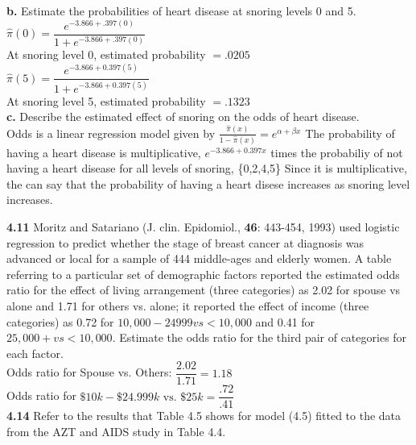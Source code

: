 \documentclass[paper=letter, fontsize=11pt]{scrartcl} %
\begin{document}
\textbf{b.} Estimate the probabilities of heart disease at snoring levels 0 and 5. \\
$\hat{\pi}(0) = \dfrac{e^{-3.866+.397(0)}}{1+e^{-3.866+.397(0)}}$ \\
At snoring level 0, estimated probability $= .0205$ \\
$\hat{\pi}(5) = \dfrac{e^{-3.866+0.397(5)}}{1+e^{-3.866+0.397(5)}}$ \\
At snoring level 5, estimated probability $= .1323$ 
\\

\textbf{c.} Describe the estimated effect of snoring on the odds of heart disease. \\
Odds is a linear regression model given by $\frac{\hat{\pi}(x)}{1-\hat{\pi}(x)}
= e^{\alpha + \beta x}$
The probability of having a heart disease is multiplicative, $e^{-3.866+0.397x}$ 
times the probabiliy of not having a heart disease for all levels of snoring, \{0,2,4,5\}
Since it is multiplicative, the can say that the probability of having a heart disese 
increases as snoring level increases.

\textbf{4.11} Moritz and Satariano (J. clin. Epidomiol., \textbf{46}: 443-454, 1993) used
logistic regression to predict whether the stage of breast cancer at diagnosis was 
advanced or local for a sample of 444 middle-ages and elderly women. A table referring to
a particular set of demographic factors reported the estimated odds ratio for the effect 
of living arrangement (three categories) as 2.02 for spouse vs alone and 1.71 for others
vs. alone; it reported the effect of income (three categories) as 0.72 for 
$10,000-24999 vs < 10,000$ and 0.41 for $25,000+ vs < 10,000$. Estimate the odds ratio 
for the third pair of categories for each factor. \\

Odds ratio for Spouse vs. Others: $\dfrac{2.02}{1.71} = 1.18$ \\
Odds ratio for $\$10k - \$24.999k \text{ vs. } \$25k = \dfrac{.72}{.41}$
\\

\textbf{4.14} Refer to the results that Table 4.5 shows for model (4.5) fitted to the data
from the AZT and AIDS study in Table 4.4. \\
\end{document}

